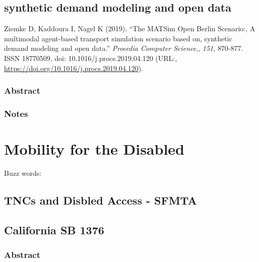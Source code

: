 \documentclass[
]{article}
\begin{document}
\hypertarget{synthetic-demand-modeling-and-open-data}{%
\subsection{synthetic demand modeling and open
data}\label{synthetic-demand-modeling-and-open-data}}

Ziemke D, Kaddoura I, Nagel K (2019). ``The MATSim Open Berlin
Scenario:, A multimodal agent-based transport simulation scenario based
on, synthetic demand modeling and open data.'' \emph{Procedia Computer
Science},, \emph{151}, 870-877. ISSN 18770509, doi:
10.1016/j.procs.2019.04.120 (URL:,
\url{https://doi.org/10.1016/j.procs.2019.04.120}).

\hypertarget{abstract-25}{%
\subsubsection{Abstract}\label{abstract-25}}

\hypertarget{notes-25}{%
\subsubsection{Notes}\label{notes-25}}

\hypertarget{mobility-for-the-disabled}{%
\section{Mobility for the Disabled}\label{mobility-for-the-disabled}}

Buzz words:

\hypertarget{tncs-and-disbled-access---sfmta}{%
\subsection{TNCs and Disbled Access -
SFMTA}\label{tncs-and-disbled-access---sfmta}}

\hypertarget{california-sb-1376}{%
\subsection{California SB 1376}\label{california-sb-1376}}

\hypertarget{abstract-26}{%
\subsubsection{Abstract}\label{abstract-26}}
\end{document}
